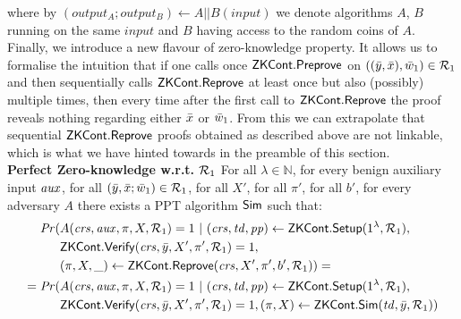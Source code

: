 \begin{definition}[ZK Continuations]
\noindent %
where by $(\mathit{output_{A}};\mathit{output_{B}}) \leftarrow A || B(\mathit{input})$ we denote algorithms $A$, $B$  running on the same 
$\mathit{input}$ and $B$ having access to the random coins of $A$. \\

\noindent Finally, we introduce a new flavour of zero-knowledge property. It allows us to formalise the intuition that if one calls once 
${\mathsf{ZKCont}}.{\mathsf{Preprove}}$ on $((\bar{y}, \bar{x}), \bar{w}_1) \in \mathcal{R}_1$ and 
then sequentially calls $ {\mathsf{ZKCont}}.{\mathsf{Reprove}} $ at least once but also (possibly) multiple times, 
then every time after the first call to $ {\mathsf{ZKCont}}.{\mathsf{Reprove}} $ the proof reveals nothing regarding either $\bar{x}$ or $\bar{w}_1$. From this we can 
extrapolate that sequential $ {\mathsf{ZKCont}}.{\mathsf{Reprove}} $ proofs obtained as described above are not linkable, which is what we have hinted towards 
in the preamble of this section. \\

\noindent \textbf{Perfect Zero-knowledge w.r.t. $\mathcal{R}_1$} For all $\lambda \in \mathbb{N}$, for every benign auxiliary input $\mathit{aux}$, 
for all  $(\bar{y}, \bar{x}; \bar{w}_1) \in \mathcal{R}_1$, for all $X'$, for all $\pi'$, for all $b'$, for every adversary $A$ there exists a PPT algorithm $ {\mathsf{Sim}} $ such that:
\begin{align*}
\mathit{Pr}(& A(\mathit{crs}, \mathit{aux}, \pi, X, \mathcal{R}_1) = 1 \ | \ (\mathit{crs}, \mathit{td}, \mathit{pp}) \leftarrow {\ensuremath{\mathsf{ZKCont}}}.{\mathsf{Setup}} (1^{\lambda}, \mathcal{R}_1), \\
                  & {\mathsf{ZKCont}}.{\mathsf{Verify}}(\mathit{crs}, \bar{y}, X', \pi', \mathcal{R}_1) = 1, \\
                  & (\pi, X, \_) \leftarrow {\ensuremath{\mathsf{ZKCont}}}.{\mathsf{Reprove}} (\mathit{crs}, X', \pi', b', \mathcal{R}_1)) =  \\
= \mathit{Pr}(& A(\mathit{crs}, \mathit{aux}, \pi, X, \mathcal{R}_1) = 1 \ | \ (\mathit{crs}, \mathit{td}, \mathit{pp}) \leftarrow {\ensuremath{\mathsf{ZKCont}}}.{\mathsf{Setup}} (1^{\lambda}, \mathcal{R}_1), \\ 
                     & {\mathsf{ZKCont}}.{\mathsf{Verify}}(\mathit{crs}, \bar{y}, X', \pi', \mathcal{R}_1) = 1, (\pi, X) \leftarrow {\ensuremath{\mathsf{ZKCont}}}.{\mathsf{Sim}}(\mathit{td}, \bar{y}, \mathcal{R}_1))
\end{align*}


\end{definition}
